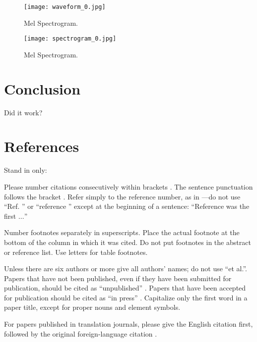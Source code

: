 \documentclass[conference]{IEEEtran}
\begin{document}
\begin{figure}[htbp]
\centerline{\texttt{[image: waveform\_0.jpg]}}
\caption{Mel Spectrogram.}
\label{fig}
\end{figure}

\begin{figure}[htbp]
\centerline{\texttt{[image: spectrogram\_0.jpg]}}
\caption{Mel Spectrogram.}
\label{fig}
\end{figure}





\section{Conclusion}

Did it work?

\section*{References}

Stand in only:

Please number citations consecutively within brackets \cite{b1}. The 
sentence punctuation follows the bracket \cite{b2}. Refer simply to the reference 
number, as in \cite{b3}---do not use ``Ref. \cite{b3}'' or ``reference \cite{b3}'' except at 
the beginning of a sentence: ``Reference \cite{b3} was the first $\ldots$''

Number footnotes separately in superscripts. Place the actual footnote at 
the bottom of the column in which it was cited. Do not put footnotes in the 
abstract or reference list. Use letters for table footnotes.

Unless there are six authors or more give all authors' names; do not use 
``et al.''. Papers that have not been published, even if they have been 
submitted for publication, should be cited as ``unpublished'' \cite{b4}. Papers 
that have been accepted for publication should be cited as ``in press'' \cite{b5}. 
Capitalize only the first word in a paper title, except for proper nouns and 
element symbols.

For papers published in translation journals, please give the English 
citation first, followed by the original foreign-language citation \cite{b6}.
\end{document}
